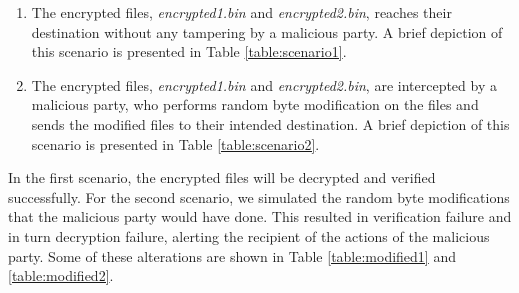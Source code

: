\documentclass{article}
\begin{document}
\begin{enumerate}
    \item The encrypted files, \textit{encrypted1.bin} and \textit{encrypted2.bin}, reaches their destination without any tampering by a malicious party. A brief depiction of this scenario is presented in Table \ref{table:scenario1}.
    \item The encrypted files, \textit{encrypted1.bin} and \textit{encrypted2.bin}, are intercepted by a malicious party, who performs random byte modification on the files and sends the modified files to their intended destination. A brief depiction of this scenario is presented in Table \ref{table:scenario2}.
\end{enumerate}
In the first scenario, the encrypted files will be decrypted and verified successfully. For the second scenario, we simulated the random byte modifications that the malicious party would have done. This resulted in verification failure and in turn decryption failure, alerting the recipient of the actions of the malicious party. Some of these alterations are shown in Table \ref{table:modified1} and \ref{table:modified2}.
\end{document}
